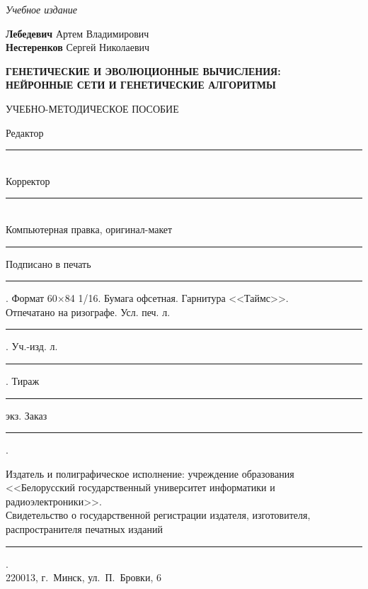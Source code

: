 \clearpage
\thispagestyle{empty}
\vspace*{\fill}
\begin{center}
\textit{Учебное издание}

\vspace{1.5em}
\textbf{Лебедевич} Артем Владимирович\\
\textbf{Нестеренков} Сергей Николаевич

\vspace{1.5em}
\textbf{ГЕНЕТИЧЕСКИЕ И ЭВОЛЮЦИОННЫЕ ВЫЧИСЛЕНИЯ:\\
НЕЙРОННЫЕ СЕТИ И ГЕНЕТИЧЕСКИЕ АЛГОРИТМЫ}

\vspace{1em}
УЧЕБНО-МЕТОДИЧЕСКОЕ ПОСОБИЕ

\vspace{2em}
{\small
Редактор \rule{4cm}{0.4pt}\\
Корректор \rule{4cm}{0.4pt}\\
Компьютерная правка, оригинал-макет \rule{4cm}{0.4pt}

\vspace{1.5em}
Подписано в печать \rule{2.5cm}{0.4pt}. Формат 60$\times$84 1/16. Бумага офсетная. Гарнитура <<Таймс>>.\\
Отпечатано на ризографе. Усл. печ. л. \rule{1cm}{0.4pt}. Уч.-изд. л. \rule{1cm}{0.4pt}.
Тираж \rule{1cm}{0.4pt} экз. Заказ \rule{1cm}{0.4pt}.

\vspace{1em}
Издатель и полиграфическое исполнение: учреждение образования\\
<<Белорусский государственный университет информатики и радиоэлектроники>>.\\
Свидетельство о государственной регистрации издателя, изготовителя,\\
распространителя печатных изданий \rule{5cm}{0.4pt}.\\
220013, г.~Минск, ул.~П.~Бровки, 6\par}
\end{center}
